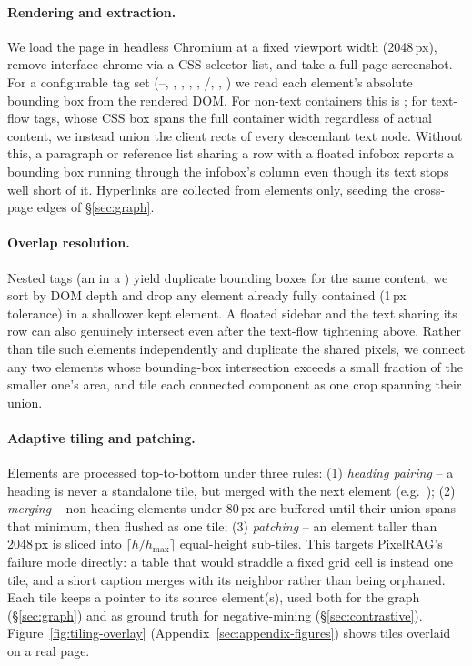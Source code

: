 \paragraph{Rendering and extraction.} We load the page in headless Chromium at a fixed viewport width (2048\,px), remove interface chrome via a CSS selector list, and take a full-page screenshot. For a configurable tag set (--, , , , , /, , ) we read each element's absolute bounding box from the rendered DOM. For non-text containers this is ; for text-flow tags, whose CSS box spans the full container width regardless of actual content, we instead union the client rects of every descendant text node. Without this, a paragraph or reference list sharing a row with a floated infobox reports a bounding box running through the infobox's column even though its text stops well short of it. Hyperlinks are collected from  elements only, seeding the cross-page edges of \S\ref{sec:graph}.

\paragraph{Overlap resolution.} Nested tags (an  in a ) yield duplicate bounding boxes for the same content; we sort by DOM depth and drop any element already fully contained (1\,px tolerance) in a shallower kept element. A floated sidebar and the text sharing its row can also genuinely intersect even after the text-flow tightening above. Rather than tile such elements independently and duplicate the shared pixels, we connect any two elements whose bounding-box intersection exceeds a small fraction of the smaller one's area, and tile each connected component as one crop spanning their union.

\paragraph{Adaptive tiling and patching.} Elements are processed top-to-bottom under three rules: (1) \emph{heading pairing} -- a heading is never a standalone tile, but merged with the next element (e.g.\ ); (2) \emph{merging} -- non-heading elements under 80\,px are buffered until their union spans that minimum, then flushed as one  tile; (3) \emph{patching} -- an element taller than 2048\,px is sliced into $\lceil h/h_{\max}\rceil$ equal-height sub-tiles. This targets PixelRAG's failure mode directly: a table that would straddle a fixed grid cell is instead one tile, and a short caption merges with its neighbor rather than being orphaned. Each tile keeps a pointer to its source element(s), used both for the graph (\S\ref{sec:graph}) and as ground truth for negative-mining (\S\ref{sec:contrastive}). Figure~\ref{fig:tiling-overlay} (Appendix~\ref{sec:appendix-figures}) shows tiles overlaid on a real page.

